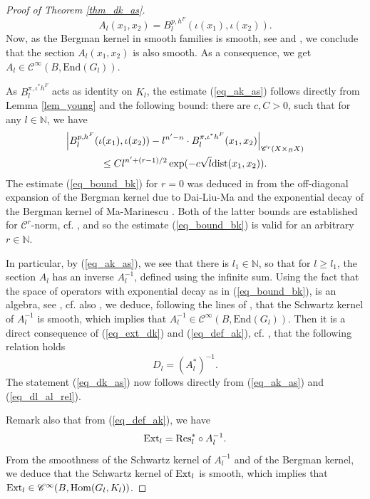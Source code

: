 \documentclass[12pt]{article}
\numberwithin{equation}{section}
\theoremstyle{theorem}
\theoremstyle{definition}
\theoremstyle{remark}
\newcommand{\res}{{\rm{Res}}}
\newcommand{\ext}{{\rm{Ext}}}
\newcommand{\nat}{\mathbb{N}}
\newcommand{\enmr}[1]{\text{End}{(#1)}}
\newcommand{\ccal}{\mathscr{C}}
\begin{document}
\begin{proof}[Proof of Theorem \ref{thm_dk_as}]
		\begin{equation}\label{eq_bound_bk0}
			A_l(x_1, x_2) = B_l^{p, h^F}(\iota(x_1), \iota(x_2)).
		\end{equation}
		Now, as the Bergman kernel in smooth families is smooth, see \cite{DaiLiuMa} and \cite{MaZhangSuperconnBKPubl}, we conclude that the section $A_l(x_1, x_2)$ is also smooth.
		As a consequence, we get $A_l \in \ccal^{\infty}(B, {\enmr{G_l}})$.
		\par 
		As $B_l^{\pi, \iota^* h^F}$ acts as identity on $K_l$, the estimate (\ref{eq_ak_as}) follows directly from Lemma \ref{lem_young} and the following bound: there are $c, C > 0$, such that for any $l \in \nat$, we have 
		\begin{multline}\label{eq_bound_bk}
			\Big|
			B_l^{p, h^F}(\iota(x_1), \iota(x_2)) - l^{n' - n} \cdot B_l^{\pi, \iota^* h^F}(x_1, x_2)
			\Big|_{\ccal^r(X \times_B X)}
			\\
			\leq
			C l^{n' + (r - 1)/2} \exp(- c \sqrt{l} {\rm{dist}}(x_1, x_2)).
		\end{multline}
		The estimate (\ref{eq_bound_bk}) for $r = 0$ was deduced in \cite[proof of Theorem 4.3]{FinToeplImm} from the off-diagonal expansion of the Bergman kernel due to Dai-Liu-Ma \cite[Theorem 4.18]{DaiLiuMa} and the exponential decay of the Bergman kernel of Ma-Marinescu \cite[Theorem 1]{MaMarOffDiag}.
		Both of the latter bounds are established for $\mathscr{C}^r$-norm, cf. \cite[Theorem 1.6]{MaZhangSuperconnBKPubl}, and so the estimate (\ref{eq_bound_bk}) is valid for an arbitrary $r \in \nat$.
		\par 
		In particular, by (\ref{eq_ak_as}), we see that there is $l_1 \in \nat$, so that for $l \geq l_1$, the section $A_l$ has an inverse $A_l^{-1}$, defined using the infinite sum. 
		Using the fact that the space of operators with exponential decay as in (\ref{eq_bound_bk}), is an algebra, see \cite[\S 3]{FinOTAs}, cf. also \cite{MaMarToepl}, we deduce, following the lines of \cite[\S 5.4]{FinSecRing}, that the Schwartz kernel of $A_l^{-1}$ is smooth, which implies that $A_l^{-1} \in \ccal^{\infty}(B, \enmr{G_l})$.
		Then it is a direct consequence of (\ref{eq_ext_dk}) and (\ref{eq_def_ak}), cf. \cite[(5.6)]{FinToeplImm}, that the following relation holds
		\begin{equation}\label{eq_dl_al_rel}
			D_l = (A_l^*)^{-1}.
		\end{equation}		
		The statement (\ref{eq_dk_as}) now follows directly from (\ref{eq_ak_as}) and (\ref{eq_dl_al_rel}).
		\par 
		Remark also that from (\ref{eq_def_ak}), we have
		\begin{equation}\label{eq_def_ak202}
			\ext_l = \res_l^* \circ A_l^{-1}.
		\end{equation}
		From the smoothness of the Schwartz kernel of $A_l^{-1}$ and of the Bergman kernel, we deduce that the Schwartz kernel of $\ext_l$ is smooth, which implies that $\ext_l \in \ccal^{\infty}(B, {\rm{Hom}}(G_l, K_l))$.
	\end{proof}
\end{document}
